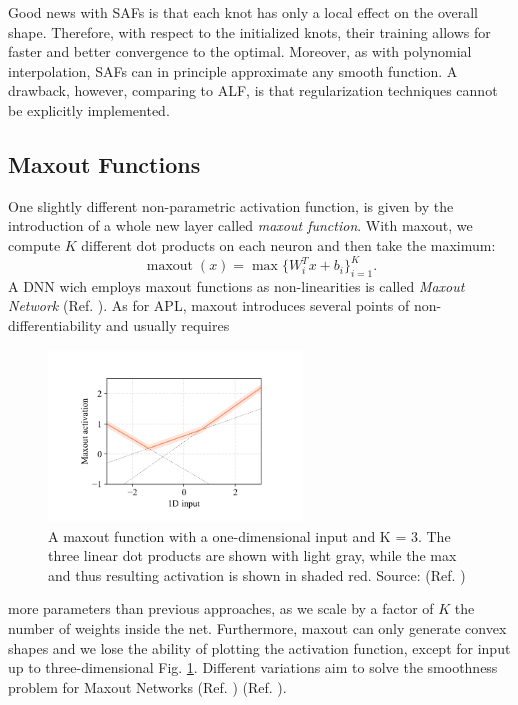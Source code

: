 \documentclass[LaM,binding=0.6cm]{./packages/sapthesis/sapthesis}
\begin{document}
    Good news with SAFs is that each knot has only a local effect on the overall shape. Therefore, with respect to the initialized knots, their training allows for faster and better convergence
    to the optimal. Moreover, as with polynomial interpolation, SAFs can in principle approximate any smooth function. A drawback, however, 
    comparing to ALF, is that regularization techniques cannot be explicitly implemented.
    \subsection{Maxout Functions}
    One slightly different non-parametric activation function, is given by the introduction of a whole new layer called \textit{maxout function}. With maxout, we compute $K$ different dot products
    on each neuron and then take the maximum:
    \begin{equation}
        \operatorname{maxout}(x) = \max \{  W_i^Tx + b_i \}_{i=1}^K .
    \end{equation}
    A DNN wich employs maxout functions as non-linearities is called \textit{Maxout Network} (Ref. ). As for APL, maxout introduces several points of non-differentiability and usually requires 
    \begin{figure}[!h]
        \centering
        \includegraphics[width=0.6\textwidth]{maxout}
        \caption{A maxout function with a one-dimensional input and K = 3. The
        three linear dot products are shown with light gray, while the max and thus resulting activation is shown
        in shaded red. Source: (Ref. )}
        \label{fig:maxout}
    \end{figure}
    more parameters than previous approaches, as we scale by a factor of $K$ the number of weights inside the net. Furthermore, maxout can only generate convex shapes and 
    we lose the ability of plotting the activation function, except for input up to three-dimensional Fig. \ref{fig:maxout}.
    Different variations aim to solve the smoothness problem for Maxout Networks (Ref. ) (Ref. ). 
\end{document}
